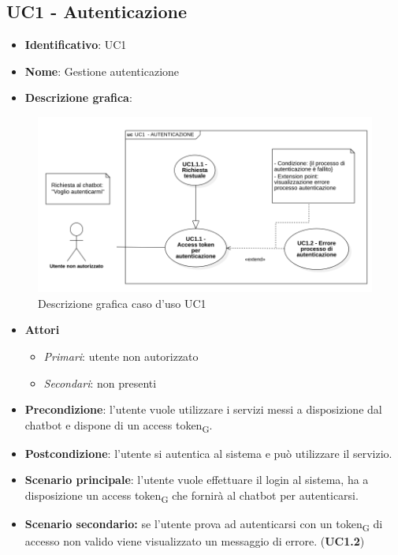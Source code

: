 \subsection{UC1 - Autenticazione}
\begin{itemize}
    \item \textbf{Identificativo}: UC1
    \item \textbf{Nome}: Gestione autenticazione
    \item \textbf{Descrizione grafica}:
\end{itemize}

\begin{figure}[h]
    \includegraphics[scale=0.50]{images/UC1.png} 
    \caption{Descrizione grafica caso d'uso UC1}
\end{figure}

 \begin{itemize}
    \item \textbf{Attori}
 \begin{itemize} 
    \item \textit{Primari}: utente non autorizzato
    \item \textit{Secondari}: non presenti
 \end{itemize}
 \item \textbf{Precondizione}: l'utente vuole utilizzare i servizi messi a disposizione dal chatbot e dispone di un access token\textsubscript{G}.
 \item \textbf{Postcondizione}: l'utente si autentica al sistema e può utilizzare il servizio.
 \item \textbf{Scenario principale}: l'utente vuole effettuare il login al sistema, ha a disposizione un access token\textsubscript{G} che fornirà al chatbot per autenticarsi.
 \item \textbf{Scenario secondario:} se l'utente prova ad autenticarsi con un token\textsubscript{G} di accesso non valido viene visualizzato un messaggio di errore. (\textbf{UC1.2})
\end{itemize}
\newpage


